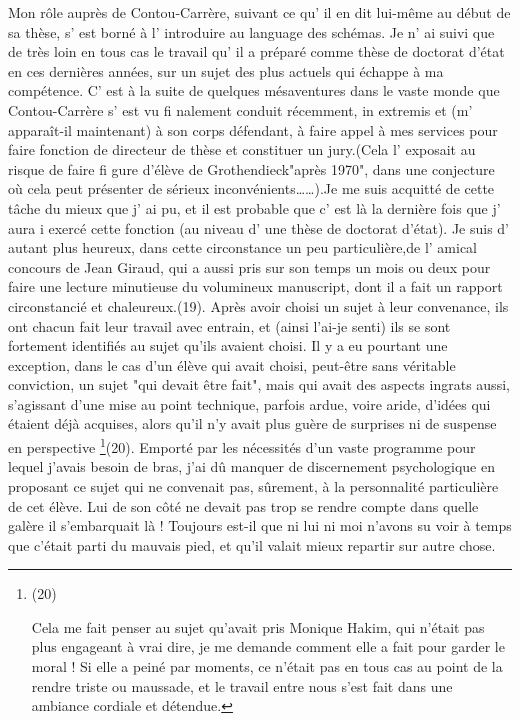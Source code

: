 {Mon rôle auprès de Contou-Carrère, suivant ce qu' il en dit lui-même au début de sa thèse, s' est borné à l' introduire au language des schémas. Je n' ai suivi que de très loin en tous cas le travail qu' il a préparé comme thèse de doctorat d'état en ces dernières années, sur un sujet des plus actuels qui échappe à ma compétence. C' est à la suite de quelques mésaventures dans le vaste monde que Contou-Carrère s' est vu fi nalement conduit récemment, in extremis et (m' apparaît-il maintenant) à son corps défendant, à faire appel à mes services pour faire fonction de directeur de thèse et constituer un jury.(Cela l' exposait au risque de faire fi gure d'élève de Grothendieck"après 1970", dans une conjecture où cela peut présenter de sérieux inconvénients……).Je me suis acquitté de cette tâche du mieux que j' ai pu, et il est probable que c' est là la dernière fois que j' aura i exercé cette fonction (au niveau d' une thèse de doctorat d'état). Je suis d' autant plus heureux, dans cette circonstance un peu particulière,de l' amical concours de Jean Giraud, qui a aussi pris sur son temps un mois ou deux pour faire une lecture minutieuse du volumineux manuscript, dont il a fait un rapport circonstancié et chaleureux.}(19). Après avoir choisi un sujet à leur convenance, ils ont chacun fait leur travail avec entrain, et (ainsi l'ai-je senti) ils se sont fortement identifiés au sujet qu'ils avaient choisi. Il y a eu pourtant une exception, dans le cas d'un élève qui avait choisi, peut-être sans véritable conviction, un sujet "qui devait être fait", mais qui avait des aspects ingrats aussi, s'agissant d'une mise au point technique, parfois ardue, voire aride, d'idées qui étaient déjà acquises, alors qu'il n'y avait plus guère de surprises ni de suspense en perspective \footnote{(20)\par Cela me fait penser au sujet qu'avait pris Monique Hakim, qui n'était pas plus engageant à vrai dire, je me demande comment elle a fait pour garder le moral ! Si elle a peiné par moments, ce n'était pas en tous cas au point de la rendre triste ou maussade, et le travail entre nous s'est fait dans une ambiance cordiale et détendue.}(20). Emporté par les nécessités d'un vaste programme pour lequel j'avais besoin de bras, j'ai dû manquer de discernement psychologique en proposant ce sujet qui ne convenait pas, sûrement, à la personnalité particulière de cet élève. Lui de son côté ne devait pas trop se rendre compte dans quelle galère il s'embarquait là ! Toujours est-il que ni lui ni moi n'avons su voir à temps que c'était parti du mauvais pied, et qu'il valait mieux repartir sur autre chose.

